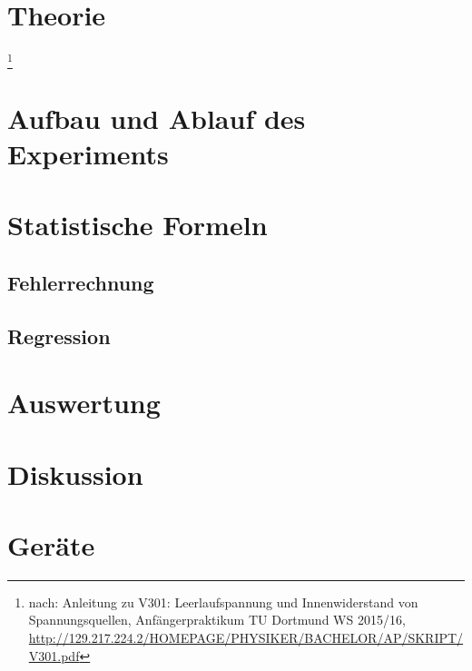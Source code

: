 \documentclass[a4,12pt]{article}
\begin{document}



\tableofcontents
\newpage


\section{Theorie}
\footnote{nach: Anleitung zu V301: Leerlaufspannung und Innenwiderstand von Spannungsquellen, Anfängerpraktikum TU Dortmund WS 2015/16, \url{http://129.217.224.2/HOMEPAGE/PHYSIKER/BACHELOR/AP/SKRIPT/V301.pdf}}

\newpage


\section{Aufbau und Ablauf des Experiments}

\clearpage

\section{Statistische Formeln}
\subsection{Fehlerrechnung}
\label{sec:Fehlerrechnung}

\subsection{Regression}
\label{sec:regression}


\section{Auswertung}

\newpage


\section{Diskussion}

\clearpage

\section{Geräte}

\end{document}
